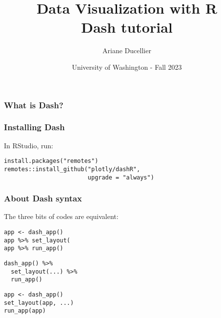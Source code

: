 \documentclass{beamer}
\title[Data Visualization with R - Dash tutorial]{Data Visualization with R \\ Dash tutorial}
\author{Ariane Ducellier}
\date{University of Washington - Fall 2023}
\begin{document}
	\begin{frame}
		\titlepage
	\end{frame}

	\begin{frame}
		\frametitle{What is Dash?}

	\end{frame}

	\begin{frame}[fragile]
		\frametitle{Installing Dash}

		In RStudio, run:

		\begin{exampleblock}{}
		\begin{BVerbatim}
install.packages("remotes")
remotes::install_github("plotly/dashR",
                        upgrade = "always")
		\end{BVerbatim}
		\end{exampleblock}{}

	\end{frame}

	\begin{frame}[fragile]
		\frametitle{About Dash syntax}

		The three bits of codes are equivalent:

		\begin{exampleblock}{}
		\begin{BVerbatim}
app <- dash_app()
app %
app %
		\end{BVerbatim}
		\end{exampleblock}{}

		\begin{exampleblock}{}
		\begin{BVerbatim}		
dash_app() %
  set_layout(...) %
  run_app()
		\end{BVerbatim}
		\end{exampleblock}{}

		\begin{exampleblock}{}
		\begin{BVerbatim}
app <- dash_app()
set_layout(app, ...)
run_app(app)
		\end{BVerbatim}
		\end{exampleblock}{}

	\end{frame}
\end{document}
